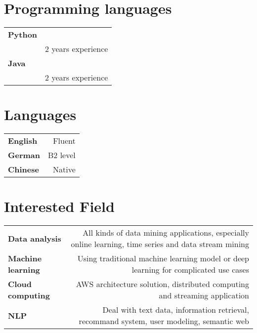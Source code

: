 \documentclass[10ptt]{article}
\begin{document}
\section*{Programming languages}
\begin{tabular}{L!{\VRule}R}
\bf Python\\&{2 years experience}\\[5pt]

\bf Java\\&{2 years experience}\\[5pt]

\end{tabular}

\section*{Languages}
\begin{tabular}{L!{\VRule}R}
\bf English&{Fluent}\\[5pt]

\bf German&{B2 level}\\[5pt]

\bf Chinese &{Native}\\[5pt]

\end{tabular}

\section*{Interested Field}
\begin{tabular}{L!{\VRule}R}
\bf Data analysis&{All kinds of data mining applications, especially online learning, time series and data stream mining}\\[10pt]

\bf Machine learning&{Using traditional machine learning model or deep learning for complicated use cases}\\[10pt]

\bf Cloud computing&{AWS architecture solution, distributed computing and streaming application}\\[20pt]

\bf NLP&{Deal with text data, information retrieval, recommand system, user modeling, semantic web }\\
\end{tabular}
\end{document}
